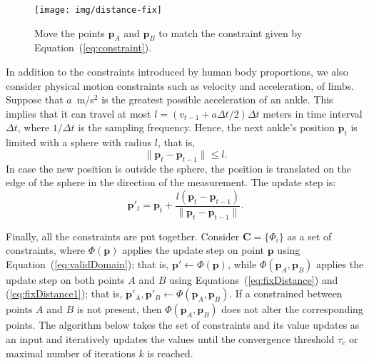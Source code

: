 \begin{figure}[!h]
\centering
\texttt{[image: img/distance-fix]}
\caption{Move the points $\mathbf{p}_A$ and $\mathbf{p}_B$ to match the constraint given by Equation~(\ref{eq:constraint}).}
\label{fig:distance-fix}
\end{figure}



In addition to the constraints introduced by human body proportions, we also consider physical motion constraints such as velocity and acceleration, of limbs. Suppose that  $a$~m/s$^2$ is the greatest possible acceleration of an ankle. This implies that it can travel at most $l=(v_{t-1}+a\Delta t/2)\Delta t$ meters in time interval $\Delta t$, where $1/\Delta t$ is the sampling frequency. Hence, the next ankle's position $\mathbf{p}_{t}$ is limited with a sphere with radius $l$, that is, 
\begin{equation}
\|\mathbf{p}_{t} - \mathbf{p}_{t-1}\| \leq l.
\end{equation}
In case the new position is outside the sphere, the position is translated on the edge of the sphere in the direction of the measurement. The update step is:
\begin{equation}
\mathbf{p}'_t = \mathbf{p}_t + \frac{l (\mathbf{p}_t - \mathbf{p}_{t-1})}{\|\mathbf{p}_t-\mathbf{p}_{t-1}\|}.
\end{equation}





Finally, all the constraints are put together. Consider $\mathbf{C}=\{\Phi_i\}$ as a set of constraints, where $\Phi(\mathbf{p})$ applies the update step on point $\mathbf{p}$ using Equation~(\ref{eq:validDomain}); that is, $\mathbf{p}' \leftarrow \Phi(\mathbf{p})$, while $\Phi(\mathbf{p}_A, \mathbf{p}_B)$ applies the update step on both points $A$ and $B$ using Equations~(\ref{eq:fixDistance}) and (\ref{eq:fixDistance1}); that is, $\mathbf{p}'_A, \mathbf{p}'_B \leftarrow \Phi(\mathbf{p}_A, \mathbf{p}_B)$.  If a constrained between points $A$ and $B$ is not present, then $\Phi(\mathbf{p}_A, \mathbf{p}_B)$ does not alter the corresponding points.
The algorithm below takes the set of constraints and its value updates as an input and iteratively updates the values until the convergence threshold $\tau_c$ or maximal number of iterations $k$ is reached.

